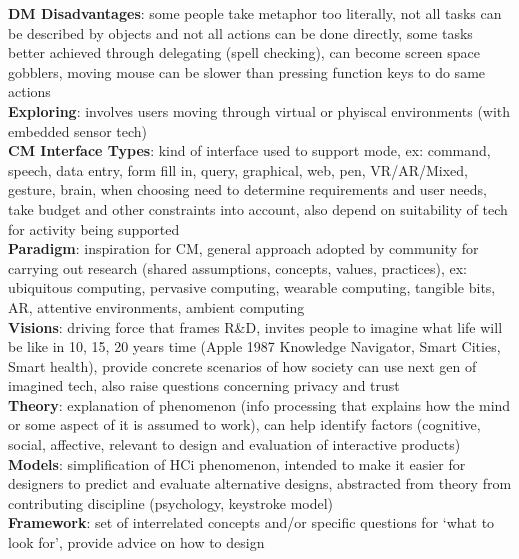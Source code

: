 \documentclass[a4paper]{article}
\begin{document}
\begin{multicols}{2}
        \textbf{DM Disadvantages}: some people take metaphor too literally, not all tasks can be described by objects and not all actions can be done directly, some tasks better achieved through delegating (spell checking), can become screen space gobblers, moving mouse can be slower than pressing function keys to do same actions\\
        \textbf{Exploring}: involves users moving through virtual or phyiscal environments (with embedded sensor tech)\\
        \textbf{CM Interface Types}: kind of interface used to support mode, ex: command, speech, data entry, form fill in, query, graphical, web, pen, VR/AR/Mixed, gesture, brain, when choosing need to determine requirements and user needs, take budget and other constraints into account, also depend on suitability of tech for activity being supported\\
        \textbf{Paradigm}: inspiration for CM, general approach adopted by community for carrying out research (shared assumptions, concepts, values, practices), ex: ubiquitous computing, pervasive computing, wearable computing, tangible bits, AR, attentive environments, ambient computing\\
        \textbf{Visions}: driving force that frames R\&D, invites people to imagine what life will be like in 10, 15, 20 years time (Apple 1987 Knowledge Navigator, Smart Cities, Smart health), provide concrete scenarios of how society can use next gen of imagined tech, also  raise questions concerning privacy and trust\\
        \textbf{Theory}: explanation of phenomenon (info processing that explains how the mind or some aspect of it is assumed to work), can help identify factors (cognitive, social, affective, relevant to design and evaluation of interactive products)\\
        \textbf{Models}: simplification of HCi phenomenon, intended to make it easier for designers to predict and evaluate alternative designs, abstracted from theory from contributing discipline (psychology, keystroke model)\\
        \textbf{Framework}: set of interrelated concepts and/or specific questions for `what to look for', provide advice on how to design\\
    \end{multicols}
    
\end{document}

